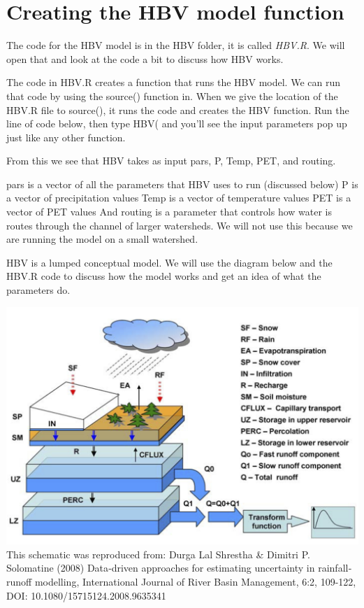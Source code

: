 \documentclass[
]{book}
\begin{document}
\hypertarget{creating-the-hbv-model-function}{%
\section{Creating the HBV model function}\label{creating-the-hbv-model-function}}

The code for the HBV model is in the HBV folder, it is called \emph{HBV.R}. We will open that and look at the code a bit to discuss how HBV works.

The code in HBV.R creates a function that runs the HBV model. We can run that code by using the source() function in. When we give the location of the HBV.R file to source(), it runs the code and creates the HBV function. Run the line of code below, then type HBV( and you'll see the input parameters pop up just like any other function.

From this we see that HBV takes as input pars, P, Temp, PET, and routing.

pars is a vector of all the parameters that HBV uses to run (discussed below)
P is a vector of precipitation values
Temp is a vector of temperature values
PET is a vector of PET values
And routing is a parameter that controls how water is routes through the channel of larger watersheds. We will not use this because we are running the model on a small watershed.

HBV is a lumped conceptual model. We will use the diagram below and the HBV.R code to discuss how the model works and get an idea of what the parameters do.

\includegraphics{images/HBV-schem-Shrestha-Solomantine-2008.png}
This schematic was reproduced from: Durga Lal Shrestha \& Dimitri P. Solomatine (2008) Data‐driven approaches for estimating uncertainty in rainfall‐runoff modelling, International Journal of River Basin Management, 6:2, 109-122, DOI: 10.1080/15715124.2008.9635341
\end{document}
